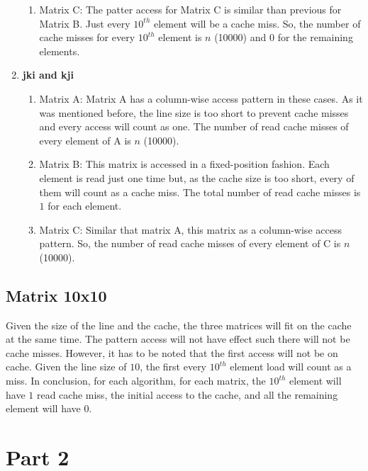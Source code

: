 \documentclass[10pt]{scrartcl}
\begin{document}
\begin{enumerate}
\begin{enumerate}
  \item Matrix C: The patter access for Matrix C is similar than previous for Matrix B.  Just every $10^{th}$ element will be a cache miss.  So, the number of cache misses for every $10^{th}$ element is $n$ (10000) and $0$ for the remaining elements.   
 \end{enumerate}
 \item \textbf{jki and kji}
 \begin{enumerate}
  \item Matrix A: Matrix A has a column-wise access pattern in these cases.  As it was mentioned before, the line size is too short to prevent cache misses and every access will count as one.  The number of read cache misses of every element of A is $n$ (10000).
  \item Matrix B: This matrix is accessed in a fixed-position fashion. Each element is read just one time but, as the cache size is too short, every of them will count as a cache miss.  The total number of read cache misses is $1$ for each element.
  \item Matrix C: Similar that matrix A, this matrix as a column-wise access pattern.  So, the number of read cache misses of every element of C is $n$ (10000). 
 \end{enumerate}
\end{enumerate}

\subsection{Matrix 10x10} \label{m10}
Given the size of the line and the cache, the three matrices will fit on the cache at the same time.  The pattern access will not have effect such there will not be cache misses.  However, it has to be noted that the first access will not be on cache.  Given the line size of $10$, the first every $10^{th}$ element load will count as a miss.  In conclusion, for each algorithm, for each matrix, the $10^{th}$ element will have $1$ read cache miss, the initial access to the cache, and all the remaining element will have $0$. 

\section{Part 2}
\end{document}
